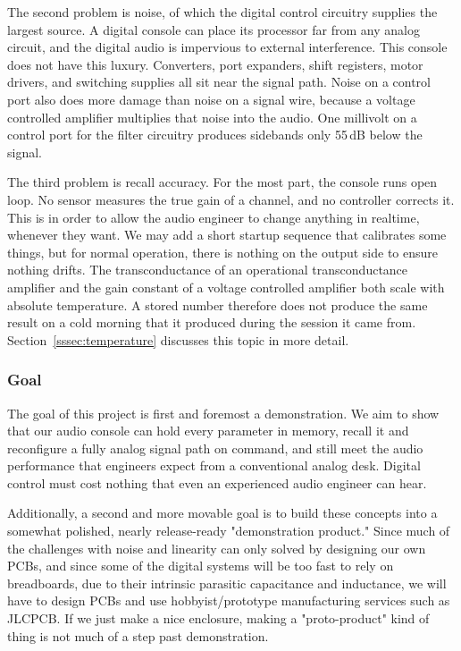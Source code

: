 \documentclass[11pt, letterpaper,titlepage]{article}
\begin{document}
The second problem is noise, of which the digital control circuitry
supplies the largest source. A digital console can place its processor far from
any analog circuit, and the digital audio is impervious to external interference. This console does not have this luxury. Converters, port expanders, shift
registers, motor drivers, and switching supplies all sit near the signal path.
Noise on a control port also does more damage than noise on a signal wire,
because a voltage controlled amplifier multiplies that noise into the audio. One
millivolt on a control port for the filter circuitry produces sidebands only 55\,dB below the signal.

The third problem is recall accuracy. For the most part, the console runs open loop. No sensor
measures the true gain of a channel, and no controller corrects it. This is in order to allow the audio engineer to change anything in realtime, whenever they want. We may add a short startup sequence that calibrates some things, but for normal operation, there is nothing on the output side to ensure nothing drifts. The
transconductance of an operational transconductance amplifier and the gain
constant of a voltage controlled amplifier both scale with absolute temperature.
A stored number therefore does not produce the same result on a cold morning
that it produced during the session it came from.
Section~\ref{sssec:temperature} discusses this topic in more detail.

\subsubsection*{Goal}

The goal of this project is first and foremost a demonstration. We aim to show
that our audio console can hold every parameter in memory, recall it and reconfigure a fully analog signal path on command, and
still meet the audio performance that engineers expect from a conventional
analog desk. Digital control must cost nothing that even an experienced audio engineer can hear.

Additionally, a second and more movable goal is to build these concepts into a somewhat polished, nearly release-ready "demonstration product." Since much of the challenges with noise and linearity can only solved by designing our own PCBs, and since some of the digital systems will be too fast to rely on breadboards, due to their intrinsic parasitic capacitance and inductance, we will have to design PCBs and use hobbyist/prototype manufacturing services such as JLCPCB. If we just make a nice enclosure, making a "proto-product" kind of thing is not much of a step past demonstration.
\end{document}
